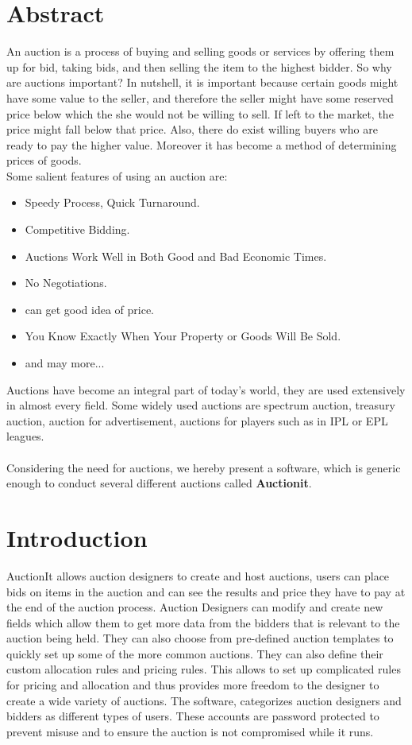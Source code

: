 \documentclass[a4paper]{article}
\begin{document}

\section*{Abstract}
An auction is a process of buying and selling goods or services by offering them up for bid, 
taking bids, and then selling the item to the highest bidder. 
So why are auctions important? In nutshell, it is important because certain goods might have some value to the seller,
and therefore the seller might have some reserved price below which the she would not be willing to sell.
If left to the market, the price might fall below that price.
Also, there do exist willing buyers who are ready to pay the higher value.
Moreover it has become a method of determining prices of goods. \\
Some salient features of using an auction are:
\begin{itemize}
	\item Speedy Process, Quick Turnaround.
	\item Competitive Bidding.
	\item Auctions Work Well in Both Good and Bad Economic Times.
	\item No Negotiations.
	\item can get good idea of price.
	\item You Know Exactly When Your Property or Goods Will Be Sold.
	\item and may more...
\end{itemize}
Auctions have become an integral part of today's world, they are used extensively in almost every field. Some widely used auctions are spectrum auction, treasury auction, auction for advertisement, auctions for players such as in IPL or EPL leagues.\\ \\
Considering the need for auctions, we hereby present a software, which is generic enough to conduct several different auctions called \textbf{Auctionit}.
\\

\section*{Introduction}
AuctionIt allows auction designers to create and host auctions, users can place bids on items in the auction and can see the results and price they have to pay at the end of the auction process. Auction Designers can modify and create new fields which allow them to get more data from the bidders that is relevant to the auction being held. They can also choose from pre-defined auction templates to quickly set up some of the more common auctions. They can also define their custom allocation rules and pricing rules. This allows to set up complicated rules for pricing and allocation and thus provides more freedom to the designer to create a wide variety of auctions. 
The software, categorizes auction designers and bidders as different types of users. These accounts are password protected to prevent misuse and to ensure the auction is not compromised while it runs.
\end{document}
